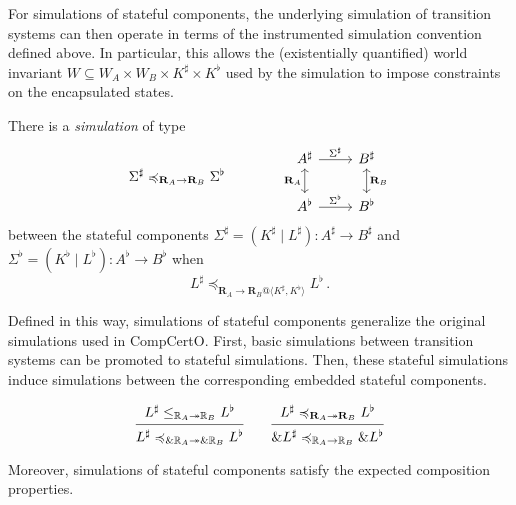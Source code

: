 \documentclass[acmsmall,screen,review,anonymous]{acmart}
\renewcommand{\preceq}{\preccurlyeq}
\begin{document}
For simulations of stateful components,
the underlying simulation of transition systems
can then operate in terms
of the instrumented simulation convention defined above.
In particular, this allows
the (existentially quantified) world invariant
$W \subseteq W_A \times W_B \times K^\sharp \times K^\flat$
used by the simulation
to impose constraints on the encapsulated states.

\begin{definition}[Simulation] \label{def:ssim} %
There is a \emph{simulation} of type
\[
  \Sigma^\sharp \preceq_{\mathbf{R}_A \rightarrow \mathbf{R}_B} \Sigma^\flat
  \qquad \qquad
\begin{tikzcd}
  A^\sharp \ar[r, "\Sigma^\sharp"]
      \ar[d, leftrightarrow, "\mathbf{R}_A"'] &
  B^\sharp \ar[d, leftrightarrow, "\mathbf{R}_B"] \\
  A^\flat \ar[r, "\Sigma^\flat"] &
  B^\flat
\end{tikzcd}
\]
between
the stateful components
$\Sigma^\sharp = (K^\sharp \mid L^\sharp) : A^\sharp \rightarrow B^\sharp$ and
$\Sigma^\flat = (K^\flat \mid L^\flat) : A^\flat \rightarrow B^\flat$
when
\[
  L^\sharp
  \preceq_{\mathbf{R}_A \rightarrow
           \mathbf{R}_B@\langle K^\sharp, K^\flat \rangle}
  L^\flat
  \,.
\]
\end{definition}

Defined in this way,
simulations of stateful components generalize
the original simulations used in CompCertO.
First,
basic simulations between transition systems
can be promoted to stateful simulations.
Then,
these stateful simulations induce
simulations between the corresponding
embedded stateful components.

\begin{lemma} %
\[
  \begin{prooftree}
    \hypo{L^\sharp
      \le_{\mathbb{R}_A \twoheadrightarrow \mathbb{R}_B}
      L^\flat}
    \infer1{L^\sharp
      \preceq_{\&\mathbb{R}_A \twoheadrightarrow \&\mathbb{R}_B}
      L^\flat}
  \end{prooftree}
  \qquad
  \begin{prooftree}
    \hypo{L^\sharp
      \preceq_{\mathbf{R}_A \twoheadrightarrow \mathbf{R}_B}
      L^\flat}
    \infer1{\&L^\sharp
      \preceq_{\mathbb{R}_A \rightarrow \mathbb{R}_B}
      \&L^\flat}
  \end{prooftree}
\]
\end{lemma}

Moreover,
simulations of stateful components satisfy the expected
composition properties.
\end{document}
